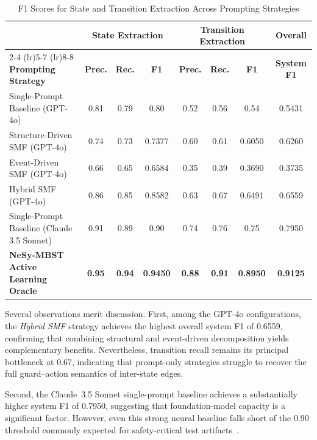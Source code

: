 \begin{table}[!t]
\centering
\caption{F1 Scores for State and Transition Extraction Across Prompting Strategies}%
\label{tab:f1_scores}
\renewcommand{\arraystretch}{1.15}
\begin{tabular}{l ccc ccc c}
\hline\hline
 & \multicolumn{3}{c}{\textbf{State Extraction}} & \multicolumn{3}{c}{\textbf{Transition Extraction}} & \textbf{Overall} \\
\cmidrule(lr){2-4} \cmidrule(lr){5-7} \cmidrule(lr){8-8}
\textbf{Prompting Strategy} & \textbf{Prec.} & \textbf{Rec.} & \textbf{F1} & \textbf{Prec.} & \textbf{Rec.} & \textbf{F1} & \textbf{System F1} \\
\hline
Single-Prompt Baseline (GPT-4o)          & 0.81 & 0.79 & 0.80   & 0.52 & 0.56 & 0.54   & 0.5431 \\
Structure-Driven SMF (GPT-4o)            & 0.74 & 0.73 & 0.7377 & 0.60 & 0.61 & 0.6050 & 0.6260 \\
Event-Driven SMF (GPT-4o)               & 0.66 & 0.65 & 0.6584 & 0.35 & 0.39 & 0.3690 & 0.3735 \\
Hybrid SMF (GPT-4o)                      & 0.86 & 0.85 & 0.8582 & 0.63 & 0.67 & 0.6491 & 0.6559 \\
Single-Prompt Baseline (Claude 3.5 Sonnet) & 0.91 & 0.89 & 0.90 & 0.74 & 0.76 & 0.75   & 0.7950 \\
\textbf{NeSy-MBST Active Learning Oracle} & \textbf{0.95} & \textbf{0.94} & \textbf{0.9450} & \textbf{0.88} & \textbf{0.91} & \textbf{0.8950} & \textbf{0.9125} \\
\hline\hline
\end{tabular}
\end{table}

Several observations merit discussion.  First, among the GPT-4o
configurations, the \emph{Hybrid SMF} strategy achieves the highest
overall system F1 of 0.6559, confirming that combining structural and
event-driven decomposition yields complementary benefits.  Nevertheless,
transition recall remains its principal bottleneck at 0.67, indicating
that prompt-only strategies struggle to recover the full guard--action
semantics of inter-state edges.

Second, the Claude~3.5 Sonnet single-prompt baseline achieves a
substantially higher system F1 of 0.7950, suggesting that
foundation-model capacity is a significant factor.  However, even this
strong neural baseline falls short of the 0.90 threshold commonly
expected for safety-critical test artifacts~\cite{whittaker1993markov,whittaker1994markov}.

